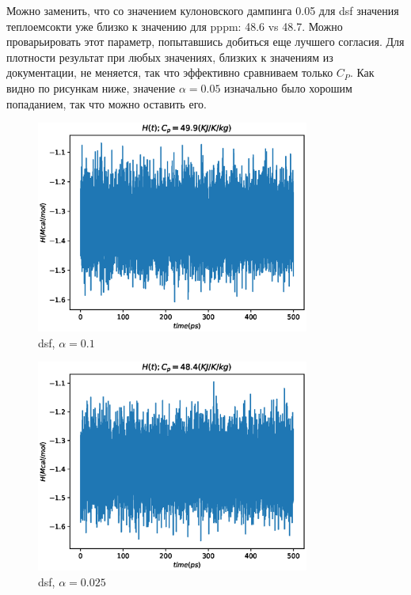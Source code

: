 \documentclass[a4paper,12pt]{article} %
\begin{document}
\newpage

Можно заменить, что со значением кулоновского дампинга 0.05 для dsf значения теплоемсокти уже близко к значению для pppm: 48.6 vs 48.7. Можно проварьировать этот параметр, попытавшись добиться еще лучшего согласия. Для плотности результат при любых значениях, близких к значениям из документации, не меняется, так что эффективно сравниваем только $C_P$. Как видно по рисункам ниже, значение $\alpha = 0.05$ изначально было хорошим попаданием, так что можно оставить его.

\begin{figure}[h!]
\begin{center}
\includegraphics[width=0.8\textwidth]{./pics/e1H}
\end{center}
\caption{dsf, $\alpha = 0.1$} \label{img:pppm_H_N5}
\end{figure}

\newpage

\begin{figure}[h!]
\begin{center}
\includegraphics[width=0.8\textwidth]{./pics/e025H}
\end{center}
\caption{dsf, $\alpha = 0.025$} \label{img:pppm_H_N5}
\end{figure}
\end{document}
